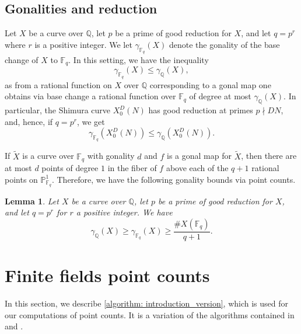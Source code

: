 \documentclass[11pt,reqno]{amsart}
\newcommand{\F}{\mathbb{F}}
\newcommand{\Q}{\mathbb{Q}}
\newtheorem{lemma}[theorem]{Lemma}
\theoremstyle{definition}
\begin{document}
\subsection{Gonalities and reduction}
Let $X$ be a curve over $\Q$, let $p$ be a prime of good reduction for $X$, and let $q=p^r$ where $r$ is a positive integer. We let $\gamma_{\F_q}(X)$ denote the gonality of the base change of $X$ to $\F_q$. In this setting, we have the inequality
\[ \gamma_{\F_q}(X) \leq \gamma_{\Q}(X), \]
as from a rational function on $X$ over $\Q$ corresponding to a gonal map one obtains via base change a rational function over $\F_q$ of degree at most $\gamma_\Q(X)$. 
In particular, the Shimura curve $X_0^D(N)$ has good reduction at primes $p \nmid DN$, and, hence, if $q = p^r$, we get 
\[
\gamma_{\F_q}(X_0^D(N)) \leq \gamma_{\Q}(X_0^D(N)).
\]

If $\widetilde{X}$ is a curve over $\F_q$ with gonality $d$ and $f$ is a gonal map for $\widetilde{X}$, then there are at most $d$ points of degree $1$ in the fiber of $f$ above each of the $q+1$ rational points on $\mathbb{P}^1_{\F_q}$. Therefore, we have the following gonality bounds via point counts. 

\begin{lemma}\label{lemma: gonality_bound_by_point_counts}
Let $X$ be a curve over $\Q$, let $p$ be a prime of good reduction for $X$, and let $q = p^r$ for $r$ a positive integer. We have
\[ \gamma_{\Q}(X) \geq \gamma_{\F_q}(X) \geq \dfrac{\#X(\F_q)}{q+1}. \]
\end{lemma}





\section{Finite fields point counts}\label{section: point_counts}


In this section, we describe \cref{algorithm: introduction_version}, which is used for our computations of point counts. It is a variation of the algorithms contained in \cite{DLMS} and \cite{DLMS26}.
\end{document}
